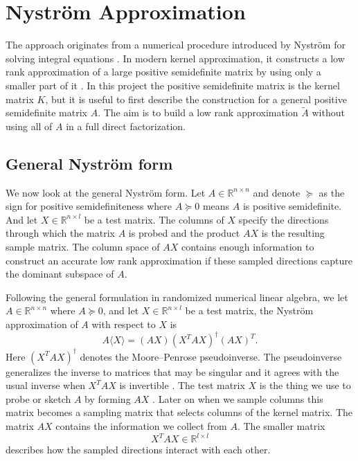 \chapter{Nystr\"om Approximation}

The approach originates from a numerical procedure introduced by Nystr\"om for solving integral equations \citep{nystrom1930practical}. In modern kernel approximation, it constructs a low rank approximation of a large positive semidefinite matrix by using only a smaller part of it \citep{williams2000using,drineas2005nystrom}. In this project the positive semidefinite matrix is the kernel matrix $K$, but it is useful to first describe the construction for a general positive semidefinite matrix $A$. The aim is to build a low rank approximation $\tilde{A}$ without using all of $A$ in a full direct factorization.

\section{General Nystr\"om form}

We now look at the general Nystr\"om form. Let $A\in\mathbb{R}^{n\times n}$ and denote $\succeq$ as the sign for positive semidefiniteness where $A\succeq0$ means $A$ is positive semidefinite. And let $X\in\mathbb R^{n\times l}$ be a test matrix. The columns of $X$ specify the directions through which the matrix $A$ is probed and the product $AX$ is the resulting sample matrix. The column space of $AX$ contains enough information to construct an accurate low rank approximation if these sampled directions capture the dominant subspace of $A$. 

Following the general formulation in randomized numerical linear algebra, we let $A\in\mathbb{R}^{n\times n}$ where $A\succeq0$, and let $X\in\mathbb{R}^{n\times l}$ be a test matrix, the Nystr\"om approximation of $A$ with respect to $X$ is
\begin{equation}
A\langle X\rangle=(AX)(X^TAX)^\dagger(AX)^T.
\label{eq:1}
\end{equation}
Here $(X^TAX)^\dagger$ denotes the Moore--Penrose pseudoinverse. The pseudoinverse generalizes the inverse to matrices that may be singular and it agrees with the usual inverse when $X^TAX$ is invertible \citep{penrose1955generalized}. The test matrix $X$ is the thing we use to probe or sketch $A$ by forming $AX$ \citep{martinsson2020randomized}. Later on when we sample columns this matrix becomes a sampling matrix that selects columns of the kernel matrix. The matrix $AX$ contains the information we collect from $A$. The smaller matrix
\[
X^TAX\in\mathbb{R}^{l\times l}
\]
describes how the sampled directions interact with each other.

